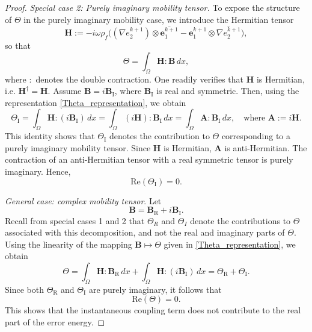 \documentclass[pdflatex,sn-mathphys-num]{sn-jnl}
\theoremstyle{thmstyleone}%
\theoremstyle{thmstyletwo}%
\theoremstyle{thmstylethree}%
\theoremstyle{definition}
\begin{document}
\begin{proof}[Proof]
		
		\noindent
		\textit{Special case 2: Purely imaginary mobility tensor.}
		To expose the structure of $\Theta$ in the purely imaginary mobility case, we introduce the Hermitian tensor
		\[
		\mathbf{H}
		:=
		-i\omega \rho_f \Big(
		(\nabla e^{k+1}_2)\otimes \overline{\mathbf{e}^{k+1}_1}
		- \mathbf{e}^{k+1}_1 \otimes \overline{\nabla e^{k+1}_2}
		\Big),
		\]
		so that
		\begin{equation}
			\Theta = \int_\Omega \mathbf{H} : \mathbf{B} \, dx,
			\label{Theta_representation}
		\end{equation}
		where $:$ denotes the double contraction.
		One readily verifies that $\mathbf{H}$ is Hermitian, i.e. $\mathbf{H}^\dagger = \mathbf{H}$.
		Assume $\mathbf{B} = i\mathbf{B}_{\mathrm{I}}$, where $\mathbf{B}_{\mathrm{I}}$ is real and symmetric. 
		Then, using the representation \eqref{Theta_representation}, we obtain
		\[
		\Theta_{\mathrm{I}} = \int_\Omega \mathbf{H} : (i\mathbf{B}_{\mathrm{I}}) \, dx=\int_\Omega (i\mathbf{H}) : \mathbf{B}_{\mathrm{I}} \, dx=\int_\Omega \mathbf{A} : \mathbf{B}_{\mathrm{I}} \, dx, \quad \mbox{where }\mathbf{A} := i \mathbf{H}.
		\]
		This identity shows that $\Theta_{\mathrm{I}}$ denotes the contribution to $\Theta$ corresponding to a purely imaginary mobility tensor.
		Since $\mathbf{H}$ is Hermitian, $\mathbf{A}$ is anti-Hermitian. The contraction of an anti-Hermitian tensor with a real symmetric tensor is purely imaginary. Hence,
		\[
		\mathrm{Re}(\Theta_{\mathrm{I}}) = 0.
		\]
		
		\medskip
		
		\noindent
		\textit{General case: complex mobility tensor}.
		Let
		\[
		\mathbf{B} = \mathbf{B}_{\mathrm{R}} + i \mathbf{B}_{\mathrm{I}}.
		\]
		Recall from special cases 1 and 2 that $\Theta_R$ and $\Theta_I$ denote the contributions to $\Theta$ associated with this decomposition, and not the real and imaginary parts of $\Theta$.
		Using the linearity of the mapping $\mathbf{B} \mapsto \Theta$ given in \eqref{Theta_representation}, we obtain
		\[
		\Theta = \int_\Omega \mathbf{H} : \mathbf{B}_{\mathrm{R}} \, dx
		+ \int_\Omega \mathbf{H} : (i \mathbf{B}_{\mathrm{I}}) \, dx
		= \Theta_{\mathrm{R}} + \Theta_{\mathrm{I}}.
		\]
		Since both $\Theta_{\mathrm{R}}$ and $\Theta_{\mathrm{I}}$ are purely imaginary, it follows that
		\[
		\mathrm{Re}(\Theta) = 0.
		\]
		This shows that the instantaneous coupling term does not contribute to the real part of the error energy.
		


\end{proof}
\end{document}
